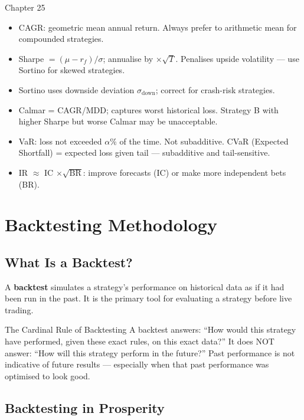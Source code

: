 \documentclass[12pt,a4paper,openany]{report}
\theoremstyle{definition}
\begin{document}
\begin{takeawaybox}{Chapter 25}
\begin{itemize}
  \item CAGR: geometric mean annual return. Always prefer to arithmetic mean for compounded strategies.
  \item Sharpe $= (\mu-r_f)/\sigma$; annualise by $\times\sqrt{T}$. Penalises upside volatility — use Sortino for skewed strategies.
  \item Sortino uses downside deviation $\sigma_\text{down}$; correct for crash-risk strategies.
  \item Calmar = CAGR/MDD; captures worst historical loss. Strategy B with higher Sharpe but worse Calmar may be unacceptable.
  \item VaR: loss not exceeded $\alpha\%$ of the time. Not subadditive. CVaR (Expected Shortfall) = expected loss given tail — subadditive and tail-sensitive.
  \item IR $\approx $ IC $\times\sqrt{\text{BR}}$: improve forecasts (IC) or make more independent bets (BR).
\end{itemize}
\end{takeawaybox}


\chapter{Backtesting Methodology}

\section{What Is a Backtest?}

A \textbf{backtest} simulates a strategy's performance on historical data as if it had been run in the past. It is the primary tool for evaluating a strategy before live trading.

\begin{warningbox}{The Cardinal Rule of Backtesting}
A backtest answers: ``How would this strategy have performed, given these exact rules, on this exact data?'' It does NOT answer: ``How will this strategy perform in the future?'' Past performance is not indicative of future results — especially when that past performance was optimised to look good.
\end{warningbox}

\section{Backtesting in Prosperity}
\end{document}
